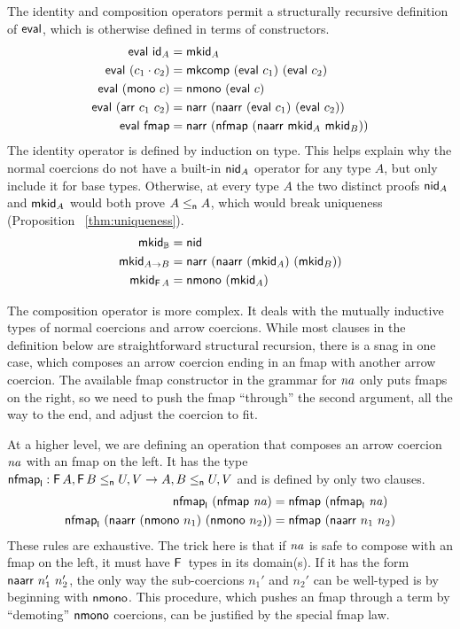 \documentclass[acmsmall,screen]{acmart}
\begin{document}
The identity and composition operators permit a structurally recursive
definition of \(\mathsf{eval}\), which is otherwise defined in terms of constructors.
\begin{align*}
  \eval{\cid{A}} &= \mkid{A} \\
  \eval{(\ccomp{c_1}{c_2})} &= \mkcomp\ (\eval{c_1})\ (\eval{c_2}) \\
  \eval{(\cmono\ c)} &= \nmono\ (\eval{c}) \\
  \eval{(\carr\ c_1\ c_2)} &= \narr\ (\naarr\ (\eval{c_1})\ (\eval{c_2})) \\
  \eval{\cfmap} &= \narr\ (\nfmap{(\naarr\ \mkid{A}\ \mkid{B})})
\end{align*}
The identity operator is defined by induction on type. This helps explain why
the normal coercions do not have a built-in \(\mathsf{nid}_A\) operator for any type
\(A\), but only include it for base types. Otherwise, at every type \(A\) the
two distinct proofs \(\mathsf{nid}_A\) and \(\mathsf{mkid}_{A}\) would both prove
\(A \leq_{\mathsf{n}} A\), which would break uniqueness (Proposition ~\ref{thm:uniqueness}).
\begin{align*}
  \mathsf{mkid}_{\mathbb{B}} &= \mathsf{nid} \\
  \mathsf{mkid}_{A \to B} &= \mathsf{narr}\ (\mathsf{naarr}\ (\mathsf{mkid}_{A})\ (\mathsf{mkid}_{B})) \\
  \mathsf{mkid}_{\mathsf{F}\, A} &= \mathsf{nmono}\ (\mathsf{mkid}_{A})
\end{align*}

The composition operator is more complex. It deals with the mutually inductive
types of normal coercions and arrow coercions. While most clauses in the
definition below are straightforward structural recursion, there is a snag in
one case, which composes an arrow coercion ending in an fmap with another arrow
coercion. The available fmap constructor in the grammar for \(\mathit{na}\) only puts
fmaps on the right, so we need to push the fmap ``through'' the second argument,
all the way to the end, and adjust the coercion to fit.

At a higher level, we are defining an operation that composes an arrow coercion
\(\mathit{na}\) with an fmap on the left.
It has the type
\(\mathsf{nfmap}_{\mathsf{l}} : \mathsf{F}\, A, \mathsf{F}\, B \leq_{\mathsf{n}} U, V \to A, B \leq_{\mathsf{n}} U, V\)
and is defined by only two clauses.
\begin{align*}
\nfmapl\ (\nfmap{\na}) &= \nfmap{(\nfmapl\ \na)} \\
\nfmapl\ (\naarr\ (\nmono\ n_1)\ (\nmono\ n_2)) &= \nfmap{(\naarr\ n_1\ n_2)}
\end{align*}
These rules are exhaustive. The trick here is that if \(\mathit{na}\) is safe to compose
with an fmap on the left, it must have \(\mathsf{F}\,\) types in its domain(s). If it has
the form \(\mathsf{naarr}\ n_1'\ n_2'\), the only way the sub-coercions \(n_1'\) and
\(n_2'\) can be well-typed is by beginning with \(\mathsf{nmono}\).  This procedure,
which pushes an fmap through a term by ``demoting'' \(\mathsf{nmono}\) coercions,
can be justified by the special fmap law.
\end{document}
